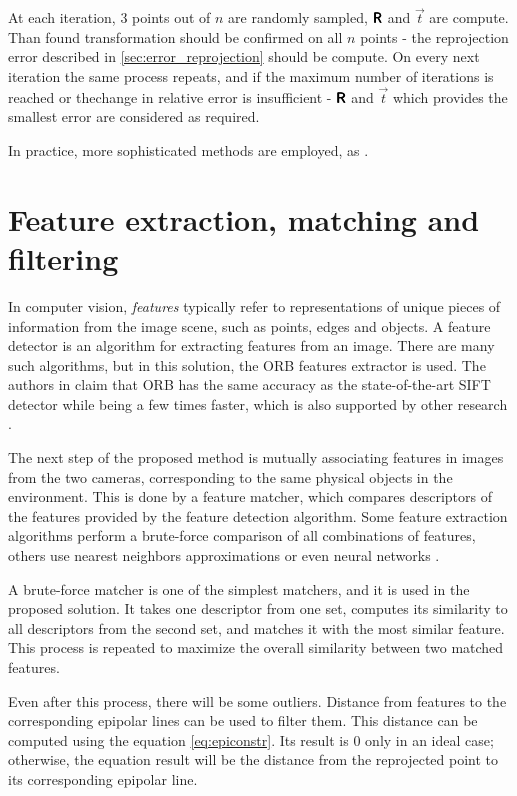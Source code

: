At each iteration, 3 points out of $n$ are randomly sampled, $\pmb{\mathsf{R}}$ and $\vec{t}$ are compute.
Than found transformation should be confirmed on all $n$ points - the reprojection error described in \autoref{sec:error_reprojection} should be compute.
On every next iteration the same process repeats, and if the maximum number of iterations is reached or thechange in relative error is insufficient - $\pmb{\mathsf{R}}$ and $\vec{t}$ which provides the smallest error are considered as required.

In practice, more sophisticated methods are employed, as \cite{Lepetit2008, Hesch2011}.

\section{Feature extraction, matching and filtering}
\label{sec:features}
In computer vision, \textit{features} typically refer to representations of unique pieces of information from the image scene, such as points, edges and objects.
A feature detector is an algorithm for extracting features from an image.
There are many such algorithms, but in this solution, the ORB features extractor is used. 
The authors in \cite{Rublee2011} claim that ORB has the same accuracy as the state-of-the-art SIFT detector while being a few times faster, which is also supported by other research \cite{Sharif2017}. 

The next step of the proposed method is mutually associating features in images from the two cameras, corresponding to the same physical objects in the environment. 
This is done by a feature matcher, which compares descriptors of the features provided by the feature detection algorithm.
Some feature extraction algorithms perform a brute-force comparison of all combinations of features, others use nearest neighbors approximations or even neural networks \cite{Sarlin2020}.

A brute-force matcher is one of the simplest matchers, and it is used in the proposed solution.
It takes one descriptor from one set, computes its similarity to all descriptors from the second set, and matches it with the most similar feature. 
This process is repeated to maximize the overall similarity between two matched features.

Even after this process, there will be some outliers.
Distance from features to the corresponding epipolar lines can be used to filter them. 
This distance can be computed using the equation \autoref{eq:epiconstr}.
Its result is $0$ only in an ideal case; otherwise, the equation result will be the distance from the reprojected point to its corresponding epipolar line.

